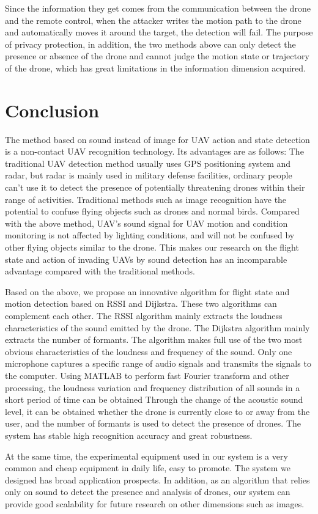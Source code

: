 \documentclass{sig-alternate-10pt}
\begin{document}
Since the information they get comes from the communication between the drone and the remote control, when the attacker writes the motion path to the drone and automatically moves it around the target, the detection will fail. The purpose of privacy protection, in addition, the two methods above can only detect the presence or absence of the drone and cannot judge the motion state or trajectory of the drone, which has great limitations in the information dimension acquired.

\section{Conclusion}
The method based on sound instead of image for UAV action and state detection is a non-contact UAV recognition technology. Its advantages are as follows: The traditional UAV detection method usually uses GPS positioning system and radar, but radar is mainly used in military defense facilities, ordinary people can’t use it to detect the presence of potentially threatening drones within their range of activities. Traditional methods such as image recognition have the potential to confuse flying objects such as drones and normal birds. Compared with the above method, UAV's sound signal for UAV motion and condition monitoring is not affected by lighting conditions, and will not be confused by other flying objects similar to the drone. This makes our research on the flight state and action of invading UAVs by sound detection has an incomparable advantage compared with the traditional methods.

Based on the above, we propose an innovative algorithm for flight state and motion detection based on RSSI and Dijkstra. These two algorithms can complement each other. The RSSI algorithm mainly extracts the loudness characteristics of the sound emitted by the drone. The Dijkstra algorithm mainly extracts the number of formants. The algorithm makes full use of the two most obvious characteristics of the loudness and frequency of the sound. Only one microphone captures a specific range of audio signals and transmits the signals to the computer. Using MATLAB to perform fast Fourier transform and other processing, the loudness variation and frequency distribution of all sounds in a short period of time can be obtained Through the change of the acoustic sound level, it can be obtained whether the drone is currently close to or away from the user, and the number of formants is used to detect the presence of drones. The system has stable high recognition accuracy and great robustness.

At the same time, the experimental equipment used in our system is a very common and cheap equipment in daily life, easy to promote. The system we designed has broad application prospects. In addition, as an algorithm that relies only on sound to detect the presence and analysis of drones, our system can provide good scalability for future research on other dimensions such as images.



  
\end{document}
